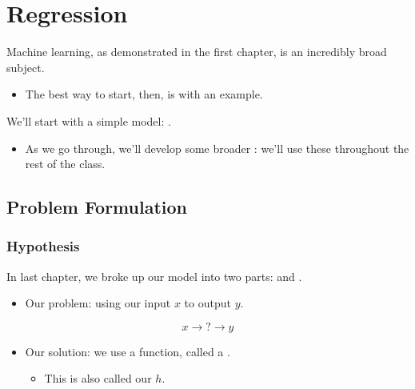 \setcounter{chapter}{1} %

\chapter{Regression}


Machine learning, as demonstrated in the first chapter, is an incredibly broad subject.

\begin{itemize}
    \item The best way to start, then, is with an example.
\end{itemize}

We'll start with a simple model: .

\begin{itemize}
    \item As we go through, we'll develop some broader : we'll use these throughout the rest of the class.
\end{itemize}

\section{Problem Formulation}

    
    
    \subsection{Hypothesis  }
    
        In last chapter, we broke up our model into two parts:  and . 
        
        \begin{itemize}
            \item Our problem: using our input $x$ to  output $y$.
        \end{itemize}
        
        $$ x \rightarrow \boxed{?} \rightarrow y $$

        \begin{itemize}
            \item Our solution: we use a function, called a .
            
            \begin{itemize}
                \item This is also called our  $h$.
            \end{itemize}

        \end{itemize}
        
